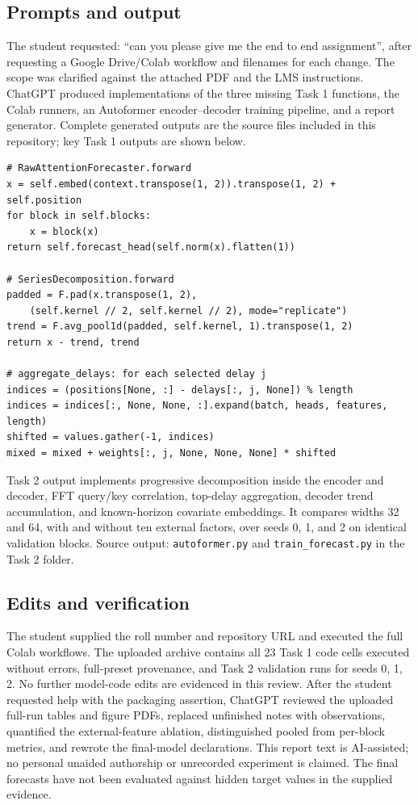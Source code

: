 \subsection*{Prompts and output}
The student requested: ``can you please give me the end to end assignment'', after requesting a Google Drive/Colab workflow and filenames for each change. The scope was clarified against the attached PDF and the LMS instructions. ChatGPT produced implementations of the three missing Task 1 functions, the Colab runners, an Autoformer encoder--decoder training pipeline, and a report generator. Complete generated outputs are the source files included in this repository; key Task 1 outputs are shown below.
\begin{verbatim}
# RawAttentionForecaster.forward
x = self.embed(context.transpose(1, 2)).transpose(1, 2) + self.position
for block in self.blocks:
    x = block(x)
return self.forecast_head(self.norm(x).flatten(1))

# SeriesDecomposition.forward
padded = F.pad(x.transpose(1, 2),
    (self.kernel // 2, self.kernel // 2), mode="replicate")
trend = F.avg_pool1d(padded, self.kernel, 1).transpose(1, 2)
return x - trend, trend

# aggregate_delays: for each selected delay j
indices = (positions[None, :] - delays[:, j, None]) % length
indices = indices[:, None, None, :].expand(batch, heads, features, length)
shifted = values.gather(-1, indices)
mixed = mixed + weights[:, j, None, None, None] * shifted
\end{verbatim}
Task 2 output implements progressive decomposition inside the encoder and decoder, FFT query/key correlation, top-delay aggregation, decoder trend accumulation, and known-horizon covariate embeddings. It compares widths 32 and 64, with and without ten external factors, over seeds 0, 1, and 2 on identical validation blocks. Source output: \texttt{autoformer.py} and \texttt{train\_forecast.py} in the Task 2 folder.
\subsection*{Edits and verification}
The student supplied the roll number and repository URL and executed the full Colab workflows. The uploaded archive contains all 23 Task 1 code cells executed without errors, full-preset provenance, and Task 2 validation runs for seeds 0, 1, 2. No further model-code edits are evidenced in this review. After the student requested help with the packaging assertion, ChatGPT reviewed the uploaded full-run tables and figure PDFs, replaced unfinished notes with observations, quantified the external-feature ablation, distinguished pooled from per-block metrics, and rewrote the final-model declarations. This report text is AI-assisted; no personal unaided authorship or unrecorded experiment is claimed. The final forecasts have not been evaluated against hidden target values in the supplied evidence.

